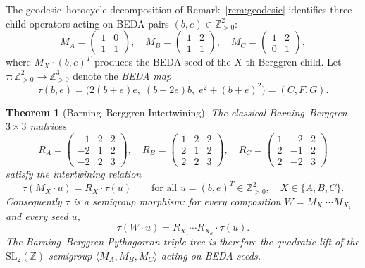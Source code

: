 \documentclass[12pt]{article}
\newtheorem{theorem}{Theorem}
\begin{document}
The geodesic--horocycle decomposition of Remark~\ref{rem:geodesic} identifies
three child operators acting on BEDA pairs $(b,e)\in\mathbb{Z}_{>0}^2$:
\begin{equation}\label{eq:beda-children}
  M_A = \begin{pmatrix}1&0\\1&1\end{pmatrix},\quad
  M_B = \begin{pmatrix}1&2\\1&1\end{pmatrix},\quad
  M_C = \begin{pmatrix}1&2\\0&1\end{pmatrix},
\end{equation}
where $M_X \cdot (b,e)^T$ produces the BEDA seed of the $X$-th Berggren child.
Let $\tau:\mathbb{Z}_{>0}^2\to\mathbb{Z}_{>0}^3$ denote the \emph{BEDA map}
\[
  \tau(b,e) = \bigl(2(b+e)e,\;(b+2e)b,\;e^2+(b+e)^2\bigr) = (C,F,G).
\]

\begin{theorem}[Barning--Berggren Intertwining]\label{thm:intertwine}
The classical Barning--Berggren $3\times 3$ matrices
\[
R_A = \begin{pmatrix}-1&2&2\\-2&1&2\\-2&2&3\end{pmatrix},\quad
R_B = \begin{pmatrix}1&2&2\\2&1&2\\2&2&3\end{pmatrix},\quad
R_C = \begin{pmatrix}1&-2&2\\2&-1&2\\2&-2&3\end{pmatrix}
\]
satisfy the intertwining relation
\[
  \tau(M_X \cdot u) = R_X \cdot \tau(u)
  \qquad \text{for all } u = (b,e)^T\in\mathbb{Z}_{>0}^2,\quad X\in\{A,B,C\}.
\]
Consequently $\tau$ is a semigroup morphism: for every composition
$W = M_{X_1}\cdots M_{X_k}$ and every seed $u$,
\[
  \tau(W \cdot u) = R_{X_1}\cdots R_{X_k}\cdot\tau(u).
\]
The Barning--Berggren Pythagorean triple tree is therefore the \emph{quadratic lift}
of the $\mathrm{SL}_2(\mathbb{Z})$ semigroup $\langle M_A,M_B,M_C\rangle$ acting on
BEDA seeds.
\end{theorem}
\end{document}
